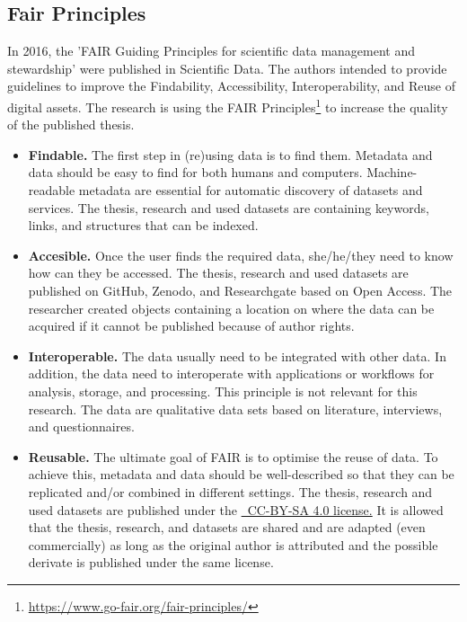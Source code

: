 \subsection{Fair Principles}
\label{sub:fair}
In 2016, the 'FAIR Guiding Principles for scientific data management and stewardship' were published in Scientific Data. The authors intended to provide guidelines to improve the Findability, Accessibility, Interoperability, and Reuse of digital assets. The research is using the FAIR Principles\footnote{\url{https://www.go-fair.org/fair-principles/}} to increase the quality of the published thesis.
\begin{itemize}
	\item{\textbf{Findable.} The first step in (re)using data is to find them. Metadata and data should be easy to find for both humans and computers. Machine-readable metadata are essential for automatic discovery of datasets and services. The thesis, research and used datasets are containing keywords, links, and structures that can be indexed.}
	\item{\textbf{Accesible.} Once the user finds the required data, she/he/they need to know how can they be accessed. The thesis, research and used datasets are published on GitHub, Zenodo, and Researchgate based on Open Access. The researcher created objects containing a location on where the data can be acquired if it cannot be published because of author rights.}
	\item{\textbf{Interoperable.} The data usually need to be integrated with other data. In addition, the data need to interoperate with applications or workflows for analysis, storage, and processing. This principle is not relevant for this research. The data are qualitative data sets based on literature, interviews, and questionnaires.}
	\item{\textbf{Reusable.} The ultimate goal of FAIR is to optimise the reuse of data. To achieve this, metadata and data should be well-described so that they can be replicated and/or combined in different settings. The thesis, research and used datasets are published under the \href{https://creativecommons.org/licenses/by-sa/4.0/}{\ccbysa\ CC-BY-SA 4.0 license.} It is allowed that the thesis, research, and datasets are shared and are adapted (even commercially) as long as the original author is attributed and the possible derivate is published under the same license.}
\end{itemize}

